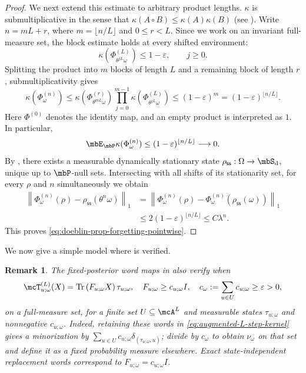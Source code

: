 \documentclass[a4paper]{article}
\numberwithin{equation}{section}   %
\theoremstyle{plain}   %
\theoremstyle{plain}   %
\newtheorem{remark}[lemma]{Remark}   %
\theoremstyle{examplestyle}
\DeclareMathOperator{\states}{\mbS_d}   %
\DeclareMathOperator{\pr}{\mbP}           %
\newcommand{\s}{\rho_{\mathsf{ss}}}     %
\renewcommand{\tr}[1]{\operatorname{Tr}\left(#1\right)} %
\newcommand{\unorm}[1]{\left\lVert#1\right\rVert}
\begin{document}
\begin{proof}
        We next extend this estimate to arbitrary product lengths.
        $\kappa$ is submultiplicative in the sense that \(\kappa(A\circ B)\le\kappa(A)\kappa(B)\) (see \cite{Replacement}).
        Write \(n=mL+r\), where \(m=\lfloor n/L\rfloor\) and \(0\le r<L\).
        Since we work on an invariant full-measure set, the block estimate holds at every shifted environment:
        \[
            \kappa\left(\Phi^{(L)}_{\theta^{jL}\omega}\right)
            \le1-\varepsilon,
            \qquad j\ge0.
        \]
        Splitting the product into \(m\) blocks of length \(L\) and a remaining block of length \(r\), submultiplicativity gives
        \[
            \kappa(\Phi^{(n)}_\omega)
            \le
            \kappa\left(\Phi^{(r)}_{\theta^{mL}\omega}\right)
            \prod_{j=0}^{m-1}
                \kappa\left(\Phi^{(L)}_{\theta^{jL}\omega}\right)
            \le
            (1-\varepsilon)^m
            =
            (1-\varepsilon)^{\lfloor n/L\rfloor}.
        \]
        Here \(\Phi^{(0)}\) denotes the identity map, and an empty product is interpreted as \(1\).
        In particular,
        \[
            \mbE_{\pr}\kappa(\Phi_\omega^{(n)})
            \le (1-\varepsilon)^{\lfloor n/L\rfloor}
            \longrightarrow0.
        \]
        By , there exists a measurable dynamically stationary state $\s:\Omega\to\states$, unique up to $\pr$-null sets.
        Intersecting with all shifts of its stationarity set, for every $\rho$ and $n$ simultaneously we obtain
        \begin{align*}
             \unorm{\Phi^{(n)}_\omega(\rho)-\s(\theta^n\omega)}_1
             &=\unorm{\Phi^{(n)}_\omega(\rho)-\Phi^{(n)}_\omega(\s(\omega))}_1\\
             &\le2(1-\varepsilon)^{\lfloor n/L\rfloor}
             \le C\lambda^n.
        \end{align*}
        This proves \eqref{eq:doeblin-prop-forgetting-pointwise}.
    \end{proof}

    We now give a simple model where  is verified. 

    \begin{remark}
        The fixed-posterior word maps in  also verify  when
        \[
             \mcT^{(L)}_{u;\omega}(X)=\tr{F_{u;\omega}X}\tau_{u;\omega},
             \quad F_{u;\omega}\ge c_{u;\omega}I,
             \quad c_\omega:=\sum_{u\in U}c_{u;\omega}\ge\varepsilon>0,
        \]
        on a full-measure set, for a finite set $U\subseteq\mcA^L$ and measurable states $\tau_{u;\omega}$ and nonnegative $c_{u;\omega}$.
        Indeed, retaining these words in \eqref{eq:augmented-L-step-kernel} gives a minorization by $\sum_{u\in U}c_{u;\omega}\delta_{(\tau_{u;\omega},u)}$; divide by $c_\omega$ to obtain $\nu_\omega$ on that set and define it as a fixed probability measure elsewhere.
        Exact state-independent replacement words correspond to $F_{u;\omega}=c_{u;\omega}I$.
    \end{remark}
\end{document}
